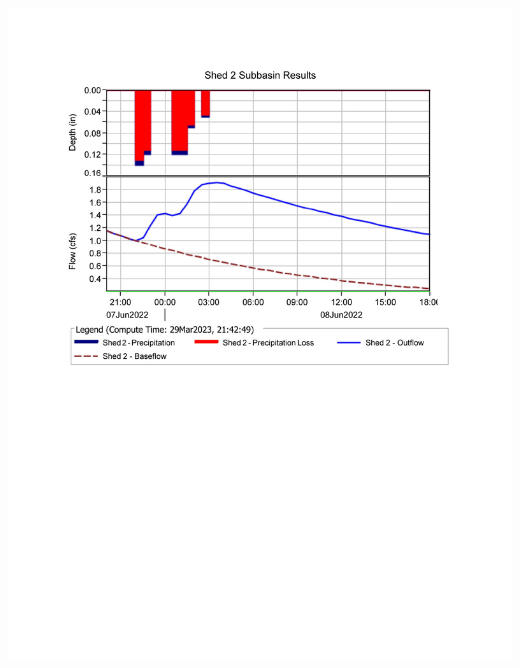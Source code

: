 \documentclass{article}
\begin{document}
\begin{center}
\includegraphics*[scale=0.7, trim = {0 12cm 0 3.1cm}]{results/Shed_2_Results.pdf}
\newpage


\end{center}
\end{document}
